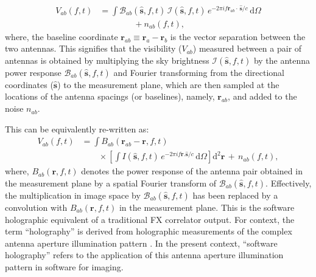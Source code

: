 \documentclass[a4paper,fleqn,usenatbib]{mnras}
\newcommand{\dif}{\mathrm{d}}
\begin{document}
\begin{align}\label{eqn:measurement-eqn-1}
  V_{ab}(f,t) &= \int \mathcal{B}_{ab}(\hat{\mathbf{s}},f,t)\,\mathcal{I}(\hat{\mathbf{s}},f,t)\,e^{-2\pi i f\mathbf{r}_{ab}\!\cdot\,\hat{\mathbf{s}}/c}\,\dif\Omega \nonumber\\
  &\qquad\qquad + n_{ab}(f,t),
\end{align}
where, the baseline coordinate $\mathbf{r}_{ab}\equiv\mathbf{r}_a-\mathbf{r}_b$ is the vector separation between the two antennas. This signifies that the visibility ($V_{ab}$) measured between a pair of antennas is obtained by multiplying the sky brightness $\mathcal{I}(\hat{\mathbf{s}},f,t)$ by the antenna power response $\mathcal{B}_{ab}(\hat{\mathbf{s}},f,t)$ and Fourier transforming from the directional coordinates ($\hat{\mathbf{s}}$) to the measurement plane, which are then sampled at the locations of the antenna spacings (or baselines), namely, $\mathbf{r}_{ab}$, and added to the noise $n_{ab}$. 

This can be equivalently re-written as:
\begin{align}\label{eqn:software-holography}
  V_{ab}(f,t) &= \int B_{ab}(\mathbf{r}_{ab}-\mathbf{r},f,t) \nonumber\\ 
              &\qquad \times \left[\int I(\hat{\mathbf{s}},f,t)\,e^{-2\pi i f\mathbf{r}.\hat{\mathbf{s}}/c}\,\dif\Omega\right]\dif^2\mathbf{r}\,+\, n_{ab}(f,t),
\end{align}
where, $B_{ab}(\mathbf{r},f,t)$ denotes the power response of the antenna pair obtained in the measurement plane by a spatial Fourier transform of $\mathcal{B}_{ab}(\hat{\mathbf{s}},f,t)$. Effectively, the multiplication in image space by $\mathcal{B}_{ab}(\hat{\mathbf{s}},f,t)$ has been replaced by a convolution with $B_{ab}(\mathbf{r},f,t)$ in the measurement plane. This is the software holographic equivalent of a traditional FX correlator output. For context, the term ``holography'' is derived from holographic measurements of the complex antenna aperture illumination pattern \citep{ben76,sco77}. In the present context, ``software holography'' refers to the application of this antenna aperture illumination pattern in software for imaging.
\end{document}
